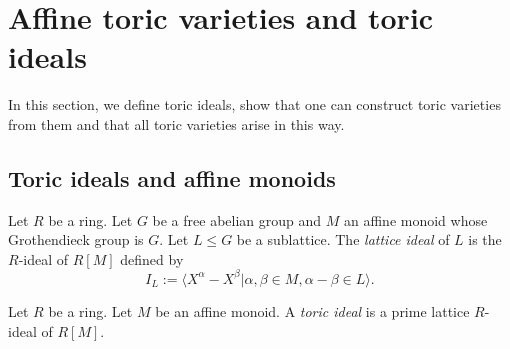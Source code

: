 \section{Affine toric varieties and toric ideals}


In this section, we define toric ideals, show that one can construct toric varieties from them
and that all toric varieties arise in this way.


\subsection{Toric ideals and affine monoids}


\begin{definition}
  \label{1-1-10-lat-ideal}
  \leanok

  Let $R$ be a ring.
  Let $G$ be a free abelian group and $M$ an affine monoid whose Grothendieck group is $G$.
  Let $L \le G$ be a sublattice.
  The \emph{lattice ideal} of $L$ is the $R$-ideal of $R[M]$ defined by
  \[
    I_L := \langle X^\alpha - X^\beta | \alpha, \beta \in M, \alpha - \beta \in L\rangle.
  \]
\end{definition}


\begin{definition}
  \label{1-1-10-tor-ideal}
  \leanok

  Let $R$ be a ring. Let $M$ be an affine monoid.
  A \emph{toric ideal} is a prime lattice $R$-ideal of $R[M]$.
\end{definition}


